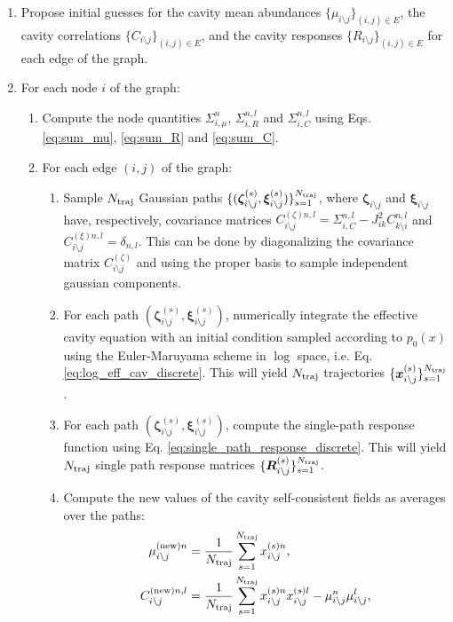 \documentclass[
    preprint,
    linenumbers,
    amsmath,amssymb,amsfonts,
    aps, physrev,
    superscriptaddress,
    10pt,
    bibnotes
    ]{revtex4-2}
\begin{document}
\begin{enumerate}
  \item Propose initial guesses for the cavity mean abundances $\{\mu_{i\setminus j}\}_{(i,j)\in E}$, the cavity correlations $\{C_{i\setminus j}\}_{(i,j)\in E}$, and the cavity responses $\{R_{i\setminus j}\}_{(i,j)\in E}$ for each edge of the graph.
  \item For each node $i$ of the graph:
  \begin{enumerate} 
    \item Compute the node quantities $\Sigma_{i,\mu}^n$, $\Sigma_{i,R}^{n,l}$ and $\Sigma_{i,C}^{n,l}$ using Eqs. \eqref{eq:sum_mu}, \eqref{eq:sum_R} and \eqref{eq:sum_C}.
    \item For each edge $(i,j)$ of the graph:
    \begin{enumerate}
      \item Sample $N_{\rm traj}$ Gaussian paths $\{(\bm{\zeta}^{(s)}_{i\setminus j},\bm{\xi}^{(s)}_{i\setminus j})\}_{s=1}^{N_{\rm traj}}$, where $\bm{\zeta}_{i\setminus j}$ and $\bm{\xi}_{i\setminus j}$ have, respectively, covariance matrices $C^{(\zeta)n,l}_{i\setminus j}=\Sigma_{i,C}^{n,l} - J_{ik}^2C^{n,l}_{k\setminus i}$ and $C^{(\xi)n,l}_{i\setminus j}=\delta_{n,l}$. This can be done by diagonalizing the covariance matrix $C^{(\zeta)}_{i\setminus j}$ and using the proper basis to sample independent gaussian components.
      \item For each path $(\bm{\zeta}^{(s)}_{i\setminus j},\bm{\xi}^{(s)}_{i\setminus j})$, numerically integrate the effective cavity equation with an initial condition sampled according to $p_0(x)$ using the Euler-Maruyama scheme in $\log$ space, i.e. Eq. \eqref{eq:log_eff_cav_discrete}. This will yield $N_{\rm traj}$ trajectories $\{\bm{x}_{i\setminus j}^{(s)}\}_{s=1}^{N_{\rm traj}}$.
      \item For each path $(\bm{\zeta}^{(s)}_{i\setminus j},\bm{\xi}^{(s)}_{i\setminus j})$, compute the single-path response function using Eq. \eqref{eq:single_path_response_discrete}. This will yield $N_{\rm traj}$ single path response matrices $\{\bm{R}^{(s)}_{i\setminus j}\}_{s=1}^{N_{\rm traj}}$.
      \item Compute the new values of the cavity self-consistent fields as averages over the paths:
      \begin{align*}
        \mu_{i\setminus j}^{({\rm new})n} & = \frac{1}{N_{\rm traj}}\sum_{s=1}^{N_{\rm traj}}x_{i\setminus j}^{(s)n},\\
        C_{i\setminus j}^{({\rm new})n,l} & = \frac{1}{N_{\rm traj}}\sum_{s=1}^{N_{\rm traj}}x_{i\setminus j}^{(s)n} x_{i\setminus j}^{(s)l} - \mu_{i\setminus j}^n \mu_{i\setminus j}^l,\\

\end{align*}
\end{enumerate}
\end{enumerate}
\end{enumerate}
\end{document}
